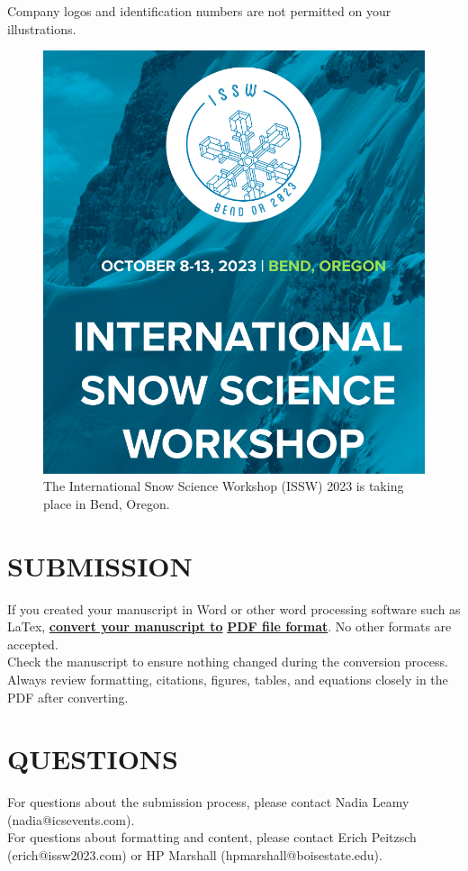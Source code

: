 \documentclass[3p,authoryear,times,twocolumn]{elsarticle_issw2018}
\begin{document}
\noindent
Company logos and identification numbers are not permitted on your illustrations.
\begin{figure}[ht]
 \centering
 \includegraphics[width=0.75\columnwidth]{./issw_logo}
 \caption{The International Snow Science Workshop (ISSW) 2023 is taking place in Bend, Oregon.}
 \label{fig.issw_logo}
\end{figure}
\section{SUBMISSION}
If you created your manuscript in Word or other word processing software such as LaTex, \textbf{\underline{convert your manuscript to}} \textbf{\underline{PDF file format}}. No other formats are accepted.\\

%
\noindent
Check the manuscript to ensure nothing changed during the conversion process. Always review formatting, citations, figures, tables, and equations closely in the PDF after converting.\\

%
\section{QUESTIONS}
For questions about the submission process, please contact Nadia Leamy (nadia@icsevents.com). \\
%
\noindent
%
For questions about formatting and content, please contact Erich Peitzsch (erich@issw2023.com) or HP Marshall (hpmarshall@boisestate.edu). %
\end{document}
